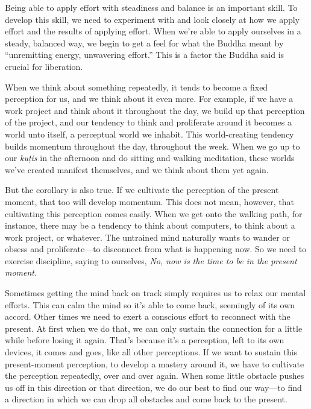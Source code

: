 Being able to apply effort with steadiness and balance is an important 
skill. To develop this skill, we need to experiment with and look 
closely at how we apply effort and the results of applying effort. When 
we're able to apply ourselves in a steady, balanced way, we begin to 
get a feel for what the Buddha meant by ``unremitting energy, 
unwavering effort.'' This is a factor the Buddha said is crucial for 
liberation.


When we think about something repeatedly, it tends to become a fixed 
perception for us, and we think about it even more. For example, if we 
have a work project and think about it throughout the day, we build up 
that perception of the project, and our tendency to think and 
proliferate around it becomes a world unto itself, a perceptual world 
we inhabit. This world-creating tendency builds momentum throughout the 
day, throughout the week. When we go up to our \emph{kuṭis} in the 
afternoon and do sitting and walking meditation, these worlds we've 
created manifest themselves, and we think about them yet again.

But the corollary is also true. If we cultivate the perception of the 
present moment, that too will develop momentum. This does not mean, 
however, that cultivating this perception comes easily. When we get 
onto the walking path, for instance, there may be a tendency to think 
about computers, to think about a work project, or whatever. The 
untrained mind naturally wants to wander or obsess and proliferate---to 
disconnect from what is happening now. So we need to exercise 
discipline, saying to ourselves, \emph{No, now is the time to be in the 
present moment.}

Sometimes getting the mind back on track simply requires us to relax 
our mental efforts. This can calm the mind so it's able to come back, 
seemingly of its own accord. Other times we need to exert a conscious 
effort to reconnect with the present. At first when we do that, we can 
only sustain the connection for a little while before losing it again. 
That's because it's a perception, left to its own devices, it comes and 
goes, like all other perceptions. If we want to sustain this 
present-moment perception, to develop a mastery around it, we have to 
cultivate the perception repeatedly, over and over again. When some 
little obstacle pushes us off in this direction or that direction, we 
do our best to find our way---to find a direction in which we can drop 
all obstacles and come back to the present.

